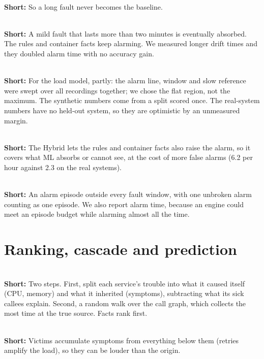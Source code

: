 \\
\textbf{Short:} So a long fault never becomes the baseline.

\\
\textbf{Short:} A mild fault that lasts more than two minutes is eventually absorbed. The rules and container facts keep alarming. We measured longer drift times and they doubled alarm time with no accuracy gain.

\\
\textbf{Short:} For the load model, partly: the alarm line, window and slow reference were swept over all recordings together; we chose the flat region, not the maximum. The synthetic numbers come from a split scored once. The real-system numbers have no held-out system, so they are optimistic by an unmeasured margin.

\\
\textbf{Short:} The Hybrid lets the rules and container facts also raise the alarm, so it covers what ML absorbs or cannot see, at the cost of more false alarms (6.2 per hour against 2.3 on the real systems).

\\
\textbf{Short:} An alarm episode outside every fault window, with one unbroken alarm counting as one episode. We also report alarm time, because an engine could meet an episode budget while alarming almost all the time.

\section{Ranking, cascade and prediction}

\\
\textbf{Short:} Two steps. First, split each service's trouble into what it caused itself (CPU, memory) and what it inherited (symptoms), subtracting what its sick callees explain. Second, a random walk over the call graph, which collects the most time at the true source. Facts rank first.

\\
\textbf{Short:} Victims accumulate symptoms from everything below them (retries amplify the load), so they can be louder than the origin.

